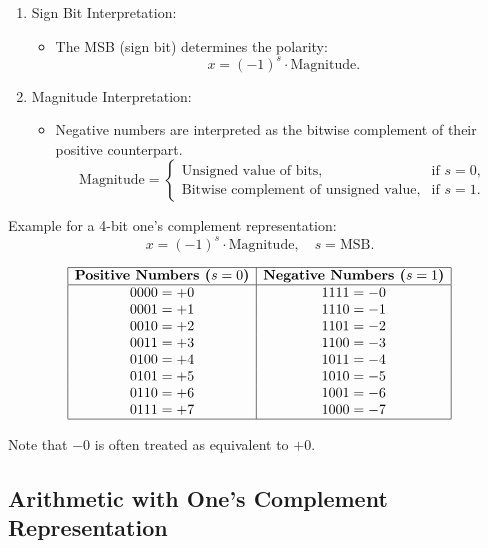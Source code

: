 \begin{enumerate}[left=1cm]
    \item Sign Bit Interpretation:
    \begin{itemize}
        \item The MSB (sign bit) determines the polarity:
        \[
        x = (-1)^s \cdot \text{Magnitude}.
        \]
    \end{itemize}

    \item Magnitude Interpretation:
    \begin{itemize}
        \item Negative numbers are interpreted as the bitwise complement of their positive counterpart.
        \[
        \text{Magnitude} = 
        \begin{cases} 
        \text{Unsigned value of bits}, & \text{if } s = 0, \\
        \text{Bitwise complement of unsigned value}, & \text{if } s = 1.
        \end{cases}
        \]
    \end{itemize}
\end{enumerate}


Example for a 4-bit one's complement representation:
\[
x = (-1)^s \cdot \text{Magnitude}, \quad s = \text{MSB}.
\]

\[
\begin{array}{|c|c|}
\hline
\textbf{Positive Numbers (\( s = 0 \))} & \textbf{Negative Numbers (\( s = 1 \))} \\
\hline
0000 = +0 & 1111 = -0 \\
0001 = +1 & 1110 = -1 \\
0010 = +2 & 1101 = -2 \\
0011 = +3 & 1100 = -3 \\
0100 = +4 & 1011 = -4 \\
0101 = +5 & 1010 = -5 \\
0110 = +6 & 1001 = -6 \\
0111 = +7 & 1000 = -7 \\
\hline
\end{array}
\]

Note that \( -0 \) is often treated as equivalent to \( +0 \).

\subsection{Arithmetic with One's Complement Representation}
